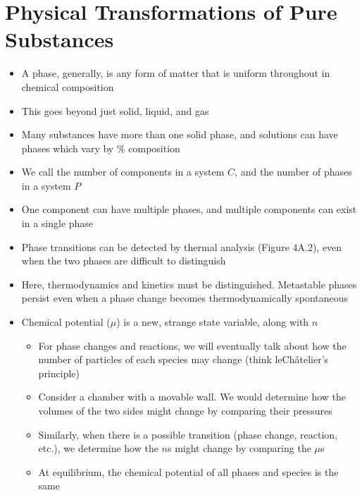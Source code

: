 \documentclass[12pt, openany, letterpaper]{memoir}
\begin{document}
\chapter{Physical Transformations of Pure Substances}
\begin{itemize}
	\item A phase, generally, is any form of matter that is uniform throughout in chemical composition
	\item This goes beyond just solid, liquid, and gas
	\item Many substances have more than one solid phase, and solutions can have phases which vary by \% composition
	\item We call the number of components in a system $C$, and the number of phases in a system $P$
	\item One component can have multiple phases, and multiple components can exist in a single phase
	\item Phase transitions can be detected by thermal analysis (Figure 4A.2), even when the two phases are difficult to distinguish
	\item Here, thermodynamics and kinetics must be distinguished. Metastable phases persist even when a phase change becomes thermodynamically spontaneous
	\item Chemical potential ($\mu$) is a new, strange state variable, along with $n$
	\begin{itemize}
		\item For phase changes and reactions, we will eventually talk about how the number of particles of each species may change (think leCh\^{a}telier's principle)
		\item Consider a chamber with a movable wall. We would determine how the volumes of the two sides might change by comparing their pressures
		\item Similarly, when there is a possible transition (phase change, reaction, etc.), we determine how the $n$s might change by comparing the $\mu$s
		\item At equilibrium, the chemical potential of all phases and species is the same
	\end{itemize}	
\end{itemize}
\end{document}
